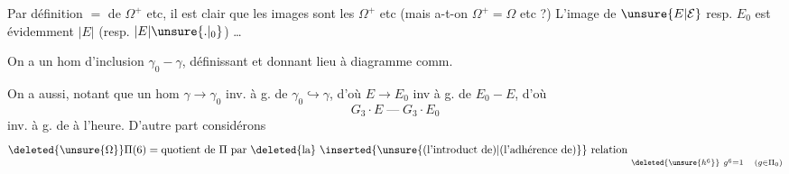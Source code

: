 Par définition $=$ de $\Omega^+$ etc, il est clair que les images sont les $\Omega^+$ etc (mais a-t-on $\Omega^+=\Omega$ etc ?)  L'image de $\unsure{E|\mathcal E}$ resp. $E_0$ est évidemment $|E|$ (resp. $|E|\unsure{.|{}_0}$) \ldots

On a un hom d'inclusion $\gamma_0\mathbin{-}\gamma$, définissant
et donnant lieu à diagramme comm.

On a aussi, notant que
un hom $\gamma\longrightarrow\gamma_0$ inv. à g. de $\gamma_0\hookrightarrow\gamma$, d'où $E\longrightarrow E_0$ inv à g. de $E_0\mathbin{-}E$, d'où
\[
G_3\cdot E\mathbin{\text{---}}G_3\cdot E_0
\]
inv. à g. de  à l'heure. D'autre part considérons
\[
\deleted{\unsure{\Omega}}\Pi(6)=\text{quotient de }\Pi\text{ par \deleted{la} \inserted{\unsure{(l'introduct de)|(l'adhérence de)}} relation }
\underset{\deleted{\unsure{h^6}}\ g^6=1\quad(g\in\Pi_0)}{\vphantom{\Pi}\strut}
\]
